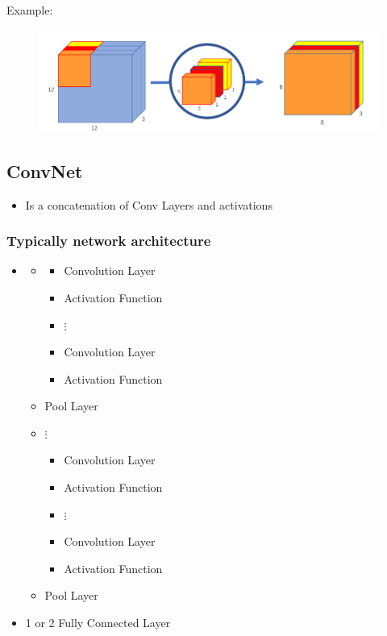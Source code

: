 \documentclass[10pt,a4paper]{article}
\newcommand{\tab}[1][1]{\hspace*{#1cm}}
\begin{document}
Example: \\
\begin{figure}[H]
	\includegraphics[width=0.7\columnwidth]{figures/xception_net.png}
\end{figure}




\subsection{ConvNet}
\begin{itemize}
	\item Is a concatenation of Conv Layers and activations
\end{itemize}

\subsubsection{Typically network architecture}
\begin{itemize}
	\item[] \begin{itemize}
		\item[] \begin{itemize}
			\item Convolution Layer
			\item Activation Function
			\item[] \tab $\vdots$
			\item Convolution Layer
			\item Activation Function
		\end{itemize}
		\item Pool Layer
		\item[] \tab $\vdots$
		\begin{itemize}
			\item Convolution Layer
			\item Activation Function
			\item[] \tab $\vdots$
			\item Convolution Layer
			\item Activation Function
		\end{itemize}
		\item Pool Layer
	\end{itemize}
	\item 1 or 2 Fully Connected Layer
\end{itemize}
\end{document}
